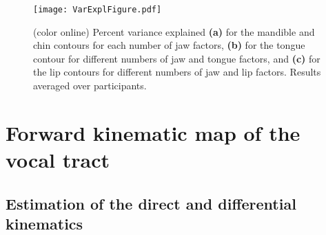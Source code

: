 \documentclass[preprint]{JASAnew}\usepackage[]{graphicx}\usepackage[]{color}
\begin{document}
\begin{figure*}

\texttt{[image: VarExplFigure.pdf]}

\caption{(color online) Percent variance explained {\bf (a)} for the mandible and chin contours for each number of jaw factors, {\bf (b)} for the tongue contour for different numbers of jaw and tongue factors, and {\bf (c)} for the lip contours for different numbers of jaw and lip factors. Results averaged over participants.}
\label{fig:varexpl}
\end{figure*}






\section{Forward kinematic map of the vocal tract}
\label{sec:forwardkinematicmap}

\subsection{Estimation of the direct and differential kinematics}
\end{document}
